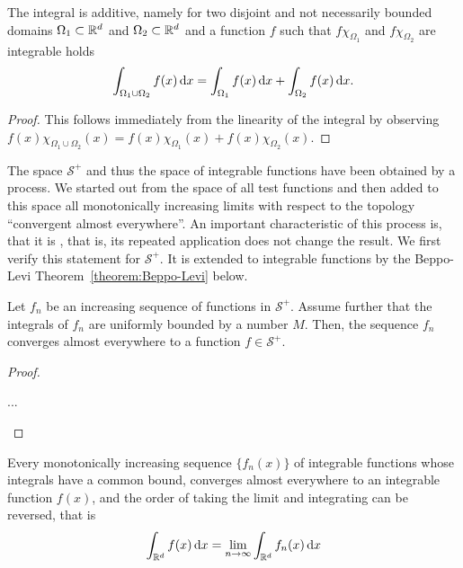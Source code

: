 \begin{corollary}
  The integral is additive, namely for two disjoint and not
  necessarily bounded domains
  $\Omega_1\subset\mathbb R^d$ and $\Omega_2\subset\mathbb R^d$ and a
  function $f$ such that $f\chi_{\Omega_1}$ and $f\chi_{\Omega_2}$ are
  integrable holds
  \begin{gather*}
    \int_{\Omega_1\cup\Omega_2} f(x)\,\mathrm{d} x
    = \int_{\Omega_1} f(x)\,\mathrm{d} x + \int_{\Omega_2} f(x)\,\mathrm{d} x.
  \end{gather*}
\end{corollary}

\begin{proof}
  This follows immediately from the linearity of the integral by
  observing $f(x)\chi_{\Omega_1\cup\Omega_2}(x) =
  f(x)\chi_{\Omega_1}(x)+f(x)\chi_{\Omega_2}(x)$.
\end{proof}

\begin{remark}
  The space $\mathcal S^+$ and thus the space of integrable functions
  have been obtained by a  process. We started
  out from the space of all test functions and then added to this
  space all monotonically increasing limits with respect to the
  topology ``convergent almost everywhere''. An important
  characteristic of this process is, that it is ,
  that is, its repeated application does not change the result. We
  first verify this statement for $\mathcal S^+$. It is extended to
  integrable functions by the Beppo-Levi
  Theorem~\ref{theorem:Beppo-Levi} below.
\end{remark}

\begin{lemma}
  Let $f_n$ be an increasing sequence of functions in $\mathcal
  S^+$. Assume further that the integrals of $f_n$ are uniformly
  bounded by a number $M$. Then, the sequence $f_n$ converges almost
  everywhere to a function $f\in\mathcal S^+$.
\end{lemma}

\begin{proof}
  \begin{todo}
    ...
  \end{todo}
\end{proof}

\begin{theorem}
  \label{theorem:Beppo-Levi}
  Every monotonically increasing sequence $\{f_n(x)\}$
  of integrable functions whose
  integrals have a common bound, converges almost everywhere to an
  integrable function $f(x)$, and the order of taking the limit and
  integrating can be reversed, that is
  \begin{gather}
    \int_{\mathbb R^d} f(x)\,\mathrm{d} x
    = \lim_{n\to\infty} \int_{\mathbb R^d} f_n(x)\,\mathrm{d} x
  \end{gather}
\end{theorem}

